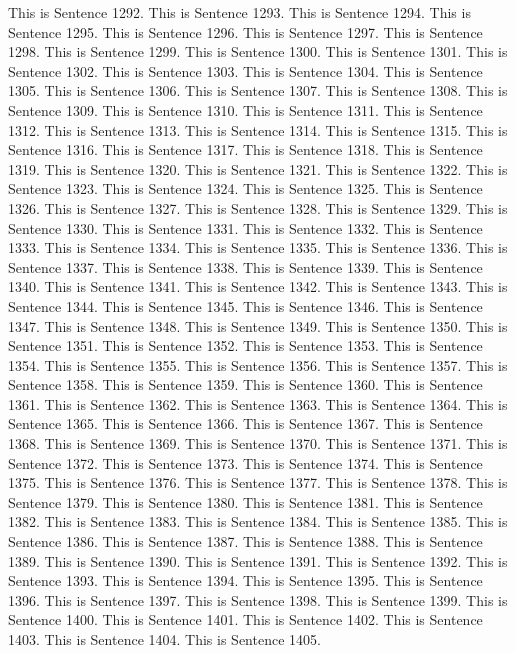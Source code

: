 \documentclass{article}
\begin{document}
This is Sentence 1292.
This is Sentence 1293.
This is Sentence 1294.
This is Sentence 1295.
This is Sentence 1296.
This is Sentence 1297.
This is Sentence 1298.
This is Sentence 1299.
This is Sentence 1300.
This is Sentence 1301.
This is Sentence 1302.
This is Sentence 1303.
This is Sentence 1304.
This is Sentence 1305.
This is Sentence 1306.
This is Sentence 1307.
This is Sentence 1308.
This is Sentence 1309.
This is Sentence 1310.
This is Sentence 1311.
This is Sentence 1312.
This is Sentence 1313.
This is Sentence 1314.
This is Sentence 1315.
This is Sentence 1316.
This is Sentence 1317.
This is Sentence 1318.
This is Sentence 1319.
This is Sentence 1320.
This is Sentence 1321.
This is Sentence 1322.
This is Sentence 1323.
This is Sentence 1324.
This is Sentence 1325.
This is Sentence 1326.
This is Sentence 1327.
This is Sentence 1328.
This is Sentence 1329.
This is Sentence 1330.
This is Sentence 1331.
This is Sentence 1332.
This is Sentence 1333.
This is Sentence 1334.
This is Sentence 1335.
This is Sentence 1336.
This is Sentence 1337.
This is Sentence 1338.
This is Sentence 1339.
This is Sentence 1340.
This is Sentence 1341.
This is Sentence 1342.
This is Sentence 1343.
This is Sentence 1344.
This is Sentence 1345.
This is Sentence 1346.
This is Sentence 1347.
This is Sentence 1348.
This is Sentence 1349.
This is Sentence 1350.
This is Sentence 1351.
This is Sentence 1352.
This is Sentence 1353.
This is Sentence 1354.
This is Sentence 1355.
This is Sentence 1356.
This is Sentence 1357.
This is Sentence 1358.
This is Sentence 1359.
This is Sentence 1360.
This is Sentence 1361.
This is Sentence 1362.
This is Sentence 1363.
This is Sentence 1364.
This is Sentence 1365.
This is Sentence 1366.
This is Sentence 1367.
This is Sentence 1368.
This is Sentence 1369.
This is Sentence 1370.
This is Sentence 1371.
This is Sentence 1372.
This is Sentence 1373.
This is Sentence 1374.
This is Sentence 1375.
This is Sentence 1376.
This is Sentence 1377.
This is Sentence 1378.
This is Sentence 1379.
This is Sentence 1380.
This is Sentence 1381.
This is Sentence 1382.
This is Sentence 1383.
This is Sentence 1384.
This is Sentence 1385.
This is Sentence 1386.
This is Sentence 1387.
This is Sentence 1388.
This is Sentence 1389.
This is Sentence 1390.
This is Sentence 1391.
This is Sentence 1392.
This is Sentence 1393.
This is Sentence 1394.
This is Sentence 1395.
This is Sentence 1396.
This is Sentence 1397.
This is Sentence 1398.
This is Sentence 1399.
This is Sentence 1400.
This is Sentence 1401.
This is Sentence 1402.
This is Sentence 1403.
This is Sentence 1404.
This is Sentence 1405.
\end{document}
